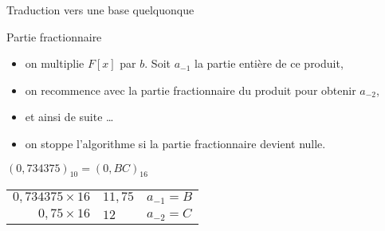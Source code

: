 \begin{frame}{Traduction vers une base quelquonque}
  \begin{block}{Partie fractionnaire}
    \begin{itemize}
    \item on multiplie $F[x]$ par $b$. Soit $a_{-1}$ la partie entière de ce produit,
    \item on recommence avec la partie fractionnaire du produit pour obtenir $a_{-2}$,
    \item et ainsi de suite \dots
    \item on stoppe l’algorithme si la partie fractionnaire devient nulle.
    \end{itemize}
  \end{block}

  \begin{exampleblock}{$(0,734375)_{10} = (0,BC)_{16}$}
    \begin{tabular}{r@{ = }ll}
      $0,734375 \times 16$ & $11,75$ & $a_{-1} = B$ \\
      $0,75 \times 16$     & $12$    & $a_{-2} = C$
    \end{tabular}
  \end{exampleblock}
\end{frame}

